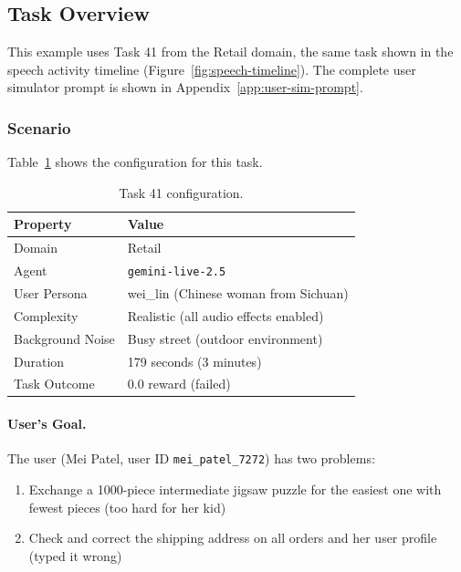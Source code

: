 \subsection{Task Overview}
\label{app:example-task}

This example uses Task 41 from the Retail domain, the same task shown in the speech activity timeline (Figure~\ref{fig:speech-timeline}). The complete user simulator prompt is shown in Appendix~\ref{app:user-sim-prompt}.

\subsubsection{Scenario}

Table~\ref{tab:task41-config} shows the configuration for this task.

\begin{table}[h]
\centering
\small
\begin{tabular}{ll}
\toprule
\textbf{Property} & \textbf{Value} \\
\midrule
Domain & Retail \\
Agent & {\color{red!75!black}\texttt{gemini-live-2.5}} \\
User Persona & wei\_lin (Chinese woman from Sichuan) \\
Complexity & Realistic (all audio effects enabled) \\
Background Noise & Busy street (outdoor environment) \\
Duration & 179 seconds (3 minutes) \\
Task Outcome & 0.0 reward (failed) \\
\bottomrule
\end{tabular}
\caption{Task 41 configuration.}
\label{tab:task41-config}
\end{table}

\paragraph{User's Goal.} The user (Mei Patel, user ID \texttt{mei\_patel\_7272}) has two problems:
\begin{enumerate}
\item Exchange a 1000-piece intermediate jigsaw puzzle for the easiest one with fewest pieces (too hard for her kid)
\item Check and correct the shipping address on all orders and her user profile (typed it wrong)
\end{enumerate}

